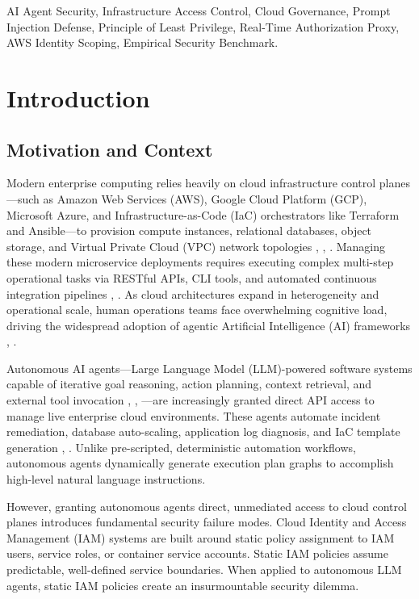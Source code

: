 \documentclass[conference]{IEEEtran}
\begin{document}
\begin{IEEEkeywords}
AI Agent Security, Infrastructure Access Control, Cloud Governance, Prompt Injection Defense, Principle of Least Privilege, Real-Time Authorization Proxy, AWS Identity Scoping, Empirical Security Benchmark.
\end{IEEEkeywords}

\section{Introduction}\label{sec:intro}

\subsection{Motivation and Context}
Modern enterprise computing relies heavily on cloud infrastructure control planes—such as Amazon Web Services (AWS), Google Cloud Platform (GCP), Microsoft Azure, and Infrastructure-as-Code (IaC) orchestrators like Terraform and Ansible—to provision compute instances, relational databases, object storage, and Virtual Private Cloud (VPC) network topologies \cite{ayers2018}, \cite{jiang2026}, \cite{hadary2020}. Managing these modern microservice deployments requires executing complex multi-step operational tasks via RESTful APIs, CLI tools, and automated continuous integration pipelines \cite{cortez2017}, \cite{huye2023}. As cloud architectures expand in heterogeneity and operational scale, human operations teams face overwhelming cognitive load, driving the widespread adoption of agentic Artificial Intelligence (AI) frameworks \cite{yang2024}, \cite{hong2024}.

Autonomous AI agents—Large Language Model (LLM)-powered software systems capable of iterative goal reasoning, action planning, context retrieval, and external tool invocation \cite{schick2023}, \cite{yao2023}, \cite{shavit2023}—are increasingly granted direct API access to manage live enterprise cloud environments. These agents automate incident remediation, database auto-scaling, application log diagnosis, and IaC template generation \cite{lange2025}, \cite{novikov2025}. Unlike pre-scripted, deterministic automation workflows, autonomous agents dynamically generate execution plan graphs to accomplish high-level natural language instructions.

However, granting autonomous agents direct, unmediated access to cloud control planes introduces fundamental security failure modes. Cloud Identity and Access Management (IAM) systems are built around static policy assignment to IAM users, service roles, or container service accounts. Static IAM policies assume predictable, well-defined service boundaries. When applied to autonomous LLM agents, static IAM policies create an insurmountable security dilemma.
\end{document}
